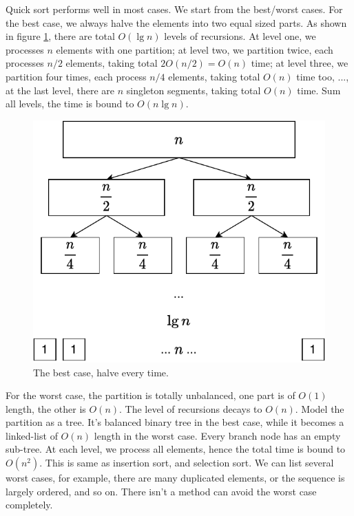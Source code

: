 \documentclass[b5paper]{article}
\begin{document}
Quick sort performs well in most cases. We start from the best/worst cases. For the best case, we always halve the elements into two equal sized parts. As shown in figure \ref{fig:qsort-best}, there are total $O(\lg n)$ levels of recursions. At level one, we processes $n$ elements with one partition; at level two, we partition twice, each processes $n/2$ elements, taking total $2 O(n/2) = O(n)$ time; at level three, we partition four times, each process $n/4$ elements, taking total $O(n)$ time too, ..., at the last level, there are $n$ singleton segments, taking total $O(n)$ time. Sum all levels, the time is bound to $O(n \lg n)$.

\begin{figure}[htbp]
 \centering
 \includegraphics[scale=0.55]{img/qsort-best}
 \caption{The best case, halve every time.}
 \label{fig:qsort-best}
\end{figure}

For the worst case, the partition is totally unbalanced, one part is of $O(1)$ length, the other is $O(n)$. The level of recursions decays to $O(n)$. Model the partition as a tree. It's balanced binary tree in the best case, while it becomes a linked-list of $O(n)$ length in the worst case. Every branch node has an empty sub-tree. At each level, we process all elements, hence the total time is bound to $O(n^2)$. This is same as insertion sort, and selection sort. We can list several worst cases, for example, there are many duplicated elements, or the sequence is largely ordered, and so on. There isn't a method can avoid the worst case completely.
\end{document}
